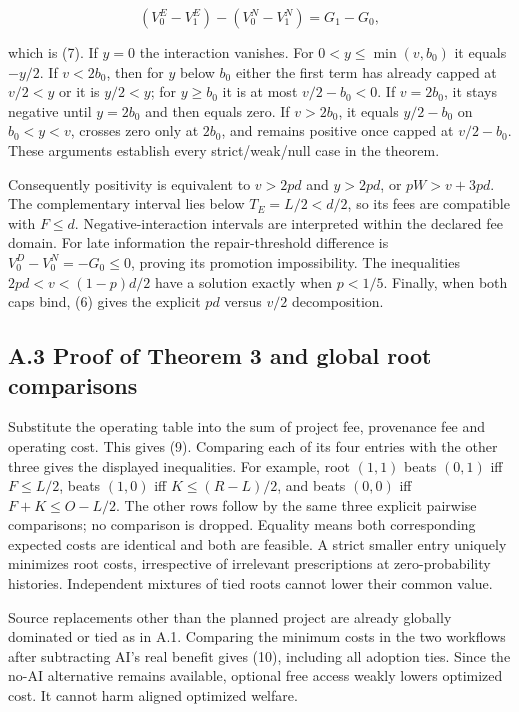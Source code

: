 \documentclass[
  11pt,
  a4paper,
]{article}
\begin{document}
\[(V_0^E-V_1^E)-(V_0^N-V_1^N)=G_1-G_0,\]

which is (7). If \(y=0\) the interaction vanishes. For
\(0<y\leq\min(v,b_0)\) it equals \(-y/2\). If \(v<2b_0\), then for \(y\)
below \(b_0\) either the first term has already capped at \(v/2<y\) or
it is \(y/2<y\); for \(y\geq b_0\) it is at most \(v/2-b_0<0\). If
\(v=2b_0\), it stays negative until \(y=2b_0\) and then equals zero. If
\(v>2b_0\), it equals \(y/2-b_0\) on \(b_0<y<v\), crosses zero only at
\(2b_0\), and remains positive once capped at \(v/2-b_0\). These
arguments establish every strict/weak/null case in the theorem.

Consequently positivity is equivalent to \(v>2pd\) and \(y>2pd\), or
\(pW>v+3pd\). The complementary interval lies below \(T_E=L/2<d/2\), so
its fees are compatible with \(F\leq d\). Negative-interaction intervals
are interpreted within the declared fee domain. For late information the
repair-threshold difference is \(V_0^D-V_0^N=-G_0\leq0\), proving its
promotion impossibility. The inequalities \(2pd<v<(1-p)d/2\) have a
solution exactly when \(p<1/5\). Finally, when both caps bind, (6) gives
the explicit \(pd\) versus \(v/2\) decomposition.

\subsection{A.3 Proof of Theorem 3 and global root
comparisons}\label{a.3-proof-of-theorem-3-and-global-root-comparisons}

Substitute the operating table into the sum of project fee, provenance
fee and operating cost. This gives (9). Comparing each of its four
entries with the other three gives the displayed inequalities. For
example, root \((1,1)\) beats \((0,1)\) iff \(F\leq L/2\), beats
\((1,0)\) iff \(K\leq(R-L)/2\), and beats \((0,0)\) iff
\(F+K\leq O-L/2\). The other rows follow by the same three explicit
pairwise comparisons; no comparison is dropped. Equality means both
corresponding expected costs are identical and both are feasible. A
strict smaller entry uniquely minimizes root costs, irrespective of
irrelevant prescriptions at zero-probability histories. Independent
mixtures of tied roots cannot lower their common value.

Source replacements other than the planned project are already globally
dominated or tied as in A.1. Comparing the minimum costs in the two
workflows after subtracting AI's real benefit gives (10), including all
adoption ties. Since the no-AI alternative remains available, optional
free access weakly lowers optimized cost. It cannot harm aligned
optimized welfare.
\end{document}
